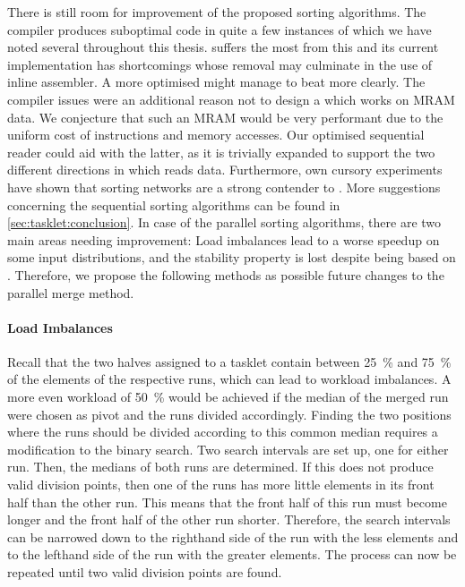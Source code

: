 There is still room for improvement of the proposed sorting algorithms.
The compiler produces suboptimal code in quite a few instances of which we have noted several throughout this thesis.
\QS{} suffers the most from this and its current implementation has shortcomings whose removal may culminate in the use of inline assembler.
A more optimised \QS{} might manage to beat \MS{} more clearly.
The compiler issues were an additional reason not to design a \QS{} which works on \ac{MRAM} data.
We conjecture that such an \ac{MRAM} \QS{} would be very performant due to the uniform cost of instructions and memory accesses.
Our optimised sequential reader could aid with the latter, as it is trivially expanded to support the two different directions in which \QS{} reads data.
Furthermore, own cursory experiments have shown that sorting networks are a strong contender to \IS{}.
More suggestions concerning the sequential sorting algorithms can be found in \cref{sec:tasklet:conclusion}.
In case of the parallel sorting algorithms, there are two main areas needing improvement:
Load imbalances lead to a worse speedup on some input distributions, and the stability property is lost despite being based on \MS{}.
Therefore, we propose the following methods as possible future changes to the parallel merge method.

\paragraph{Load Imbalances}
Recall that the two halves assigned to a tasklet contain between \qty{25}{\percent} and \qty{75}{\percent} of the elements of the respective runs, which can lead to workload imbalances.
A more even workload of \qty{50}{\percent} would be achieved if the median of the merged run were chosen as pivot and the runs divided accordingly.
Finding the two positions where the runs should be divided according to this common median requires a modification to the binary search.
Two search intervals are set up, one for either run.
Then, the medians of both runs are determined.
If this does not produce valid division points, then one of the runs has more little elements in its front half than the other run.
This means that the front half of this run must become longer and the front half of the other run shorter.
Therefore, the search intervals can be narrowed down to the righthand side of the run with the less elements and to the lefthand side of the run with the greater elements.
The process can now be repeated until two valid division points are found.

